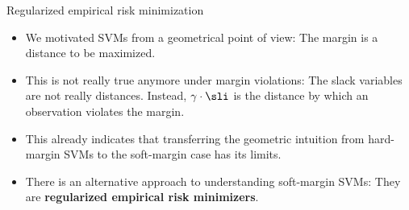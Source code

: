 \documentclass[11pt,compress,t,notes=noshow, xcolor=table]{beamer}
\begin{document}


\begin{vbframe}{Regularized empirical risk minimization}

  \begin{itemize}
    \item We motivated SVMs from a geometrical point of view: The margin is a distance to be maximized.
    \item This is not really true anymore under margin violations:
    The slack variables are not really distances. 
    Instead, $\gamma \cdot \sli$ is the distance by
    which an observation violates the margin.
    \item This already indicates that transferring the
    geometric intuition from hard-margin SVMs to
    the soft-margin case has its limits.
    \item There is an alternative approach to understanding
    soft-margin SVMs: They are \textbf{regularized
    empirical risk minimizers}.
  \end{itemize}
\end{vbframe}
\end{document}

